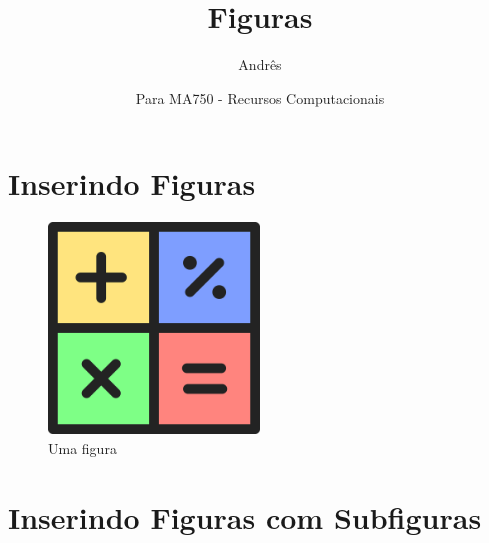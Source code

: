 \documentclass[12pt,a4paper]{article}
\title{Figuras}
\author{Andrês}
\date{Para MA750 - Recursos Computacionais}
\begin{document}
\maketitle

\section{Inserindo Figuras}

\begin{figure}[H]
  \centering
  \includegraphics[width=0.5\textwidth]{figura}
  \caption{Uma figura}
  \label{fig:figura}
\end{figure}

\section{Inserindo Figuras com Subfiguras}
\end{document}
